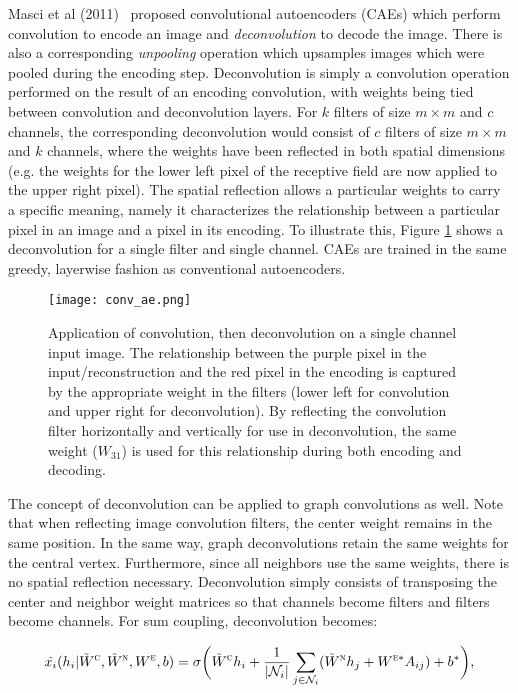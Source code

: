 Masci et al (2011)~\cite{masci2011} proposed convolutional autoencoders (CAEs) which perform convolution to encode an image and \emph{deconvolution} to decode the image.
There is also a corresponding \emph{unpooling} operation which upsamples images which were pooled during the encoding step.
Deconvolution is simply a convolution operation performed on the result of an encoding convolution, with weights being tied between convolution and deconvolution layers.
For $k$ filters of size $m \times m$ and $c$ channels, the corresponding deconvolution would consist of $c$ filters of size $m \times m$ and $k$ channels, where the weights have been reflected in both spatial dimensions (e.g. the weights for the lower left pixel of the receptive field are now applied to the upper right pixel).
The spatial reflection allows a particular weights to carry a specific meaning, namely it characterizes the relationship between a particular pixel in an image and a pixel in its encoding.
To illustrate this, Figure \ref{fig:deconv} shows a deconvolution for a single filter and single channel.
CAEs are trained in the same greedy, layerwise fashion as conventional autoencoders.

\begin{figure}
	\texttt{[image: conv\_ae.png]}
	\caption{Application of convolution, then deconvolution on a single channel input image. The relationship between the purple pixel in the input/reconstruction and the red pixel in the encoding is captured by the appropriate weight in the filters (lower left for convolution and upper right for deconvolution). By reflecting the convolution filter horizontally and vertically for use in deconvolution, the same weight ($W_{31}$) is used for this relationship during both encoding and decoding.
		\label{fig:deconv}}
\end{figure}


The concept of deconvolution can be applied to graph convolutions as well.
Note that when reflecting image convolution filters, the center weight remains in the same position.
In the same way, graph deconvolutions retain the same weights for the central vertex. 
Furthermore, since all neighbors use the same weights, there is no spatial reflection necessary.
Deconvolution simply consists of transposing the center and neighbor weight matrices so that channels become filters and filters become channels.
For sum coupling, deconvolution becomes:

\begin{equation}
\hat{x_i}(h_i | \tilde{W}^\textsc{c}, \tilde{W}^\textsc{n}, W^\textsc{e}, b) = \sigma \bigg( \tilde{W}^{\textsc{c}} h_i + \frac{1}{|\mathcal{N}_i|}\sum_{j \in \mathcal{N}_i} (\tilde{W}^{\textsc{n}} h_j + W^{\textsc{e}*} A_{ij}) + b^* \bigg),
\label{eq:sum_deconv}
\end{equation}

